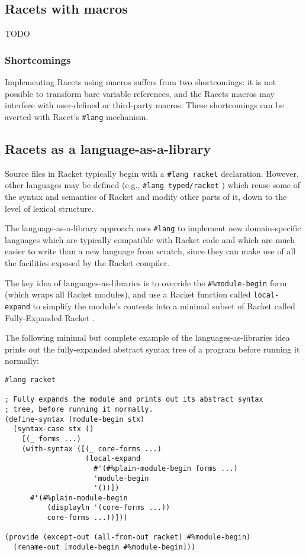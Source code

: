 \documentclass{article}
\begin{document}
\subsection{Racets with macros}
TODO

\subsubsection{Shortcomings}
Implementing Racets using macros suffers from two shortcomings: it is not possible to transform bare variable references, and the Racets macros may interfere with user-defined or third-party macros. These shortcomings can be averted with Racet's \texttt{\#lang} mechanism.

\subsection{Racets as a language-as-a-library}
Source files in Racket typically begin with a \texttt{\#lang racket} declaration. However, other languages may be defined (e.g., \texttt{\#lang typed/racket} \cite{typed-racket}) which reuse some of the syntax and semantics of Racket and modify other parts of it, down to the level of lexical structure.

The language-as-a-library approach \cite{typed-racket} uses \texttt{\#lang} to implement new domain-specific languages which are typically compatible with Racket code and which are much easier to write than a new language from scratch, since they can make use of all the facilities exposed by the Racket compiler.

The key idea of languages-as-libraries is to override the \texttt{\#\%module-begin} form (which wraps all Racket modules), and use a Racket function called \texttt{local-expand} to simplify the module's contents into a minimal subset of Racket called Fully-Expanded Racket \cite{fe-racket}.

The following minimal but complete example of the languages-as-libraries idea prints out the fully-expanded abstract syntax tree of a program before running it normally:

\begin{lstlisting}
#lang racket

; Fully expands the module and prints out its abstract syntax
; tree, before running it normally.
(define-syntax (module-begin stx)
  (syntax-case stx ()
    [(_ forms ...)
    (with-syntax ([(_ core-forms ...)
                   (local-expand
                     #'(#%plain-module-begin forms ...)
                     'module-begin
                     '())])
      #'(#%plain-module-begin
          (displayln '(core-forms ...))
          core-forms ...))]))

(provide (except-out (all-from-out racket) #%module-begin)
  (rename-out [module-begin #%module-begin]))
\end{lstlisting}
\end{document}
